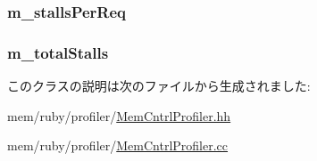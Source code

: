 \label{classMemCntrlProfiler_a734869c8bd10780ed7f61eadb638f30c}
\hypertarget{classMemCntrlProfiler_aa57a4835e0f5b5c96bd2d9bd11346e3f}{
\subsubsection[{m\_\-stallsPerReq}]{ {\bf m\_\-stallsPerReq}}}
\label{classMemCntrlProfiler_aa57a4835e0f5b5c96bd2d9bd11346e3f}
\hypertarget{classMemCntrlProfiler_a505cbdb7eb24fd8426a2c6a864e7aba7}{
\subsubsection[{m\_\-totalStalls}]{ {\bf m\_\-totalStalls}}}
\label{classMemCntrlProfiler_a505cbdb7eb24fd8426a2c6a864e7aba7}


このクラスの説明は次のファイルから生成されました:\begin{DoxyCompactItemize}
\item 
mem/ruby/profiler/\hyperlink{MemCntrlProfiler_8hh}{MemCntrlProfiler.hh}\item 
mem/ruby/profiler/\hyperlink{MemCntrlProfiler_8cc}{MemCntrlProfiler.cc}\end{DoxyCompactItemize}
